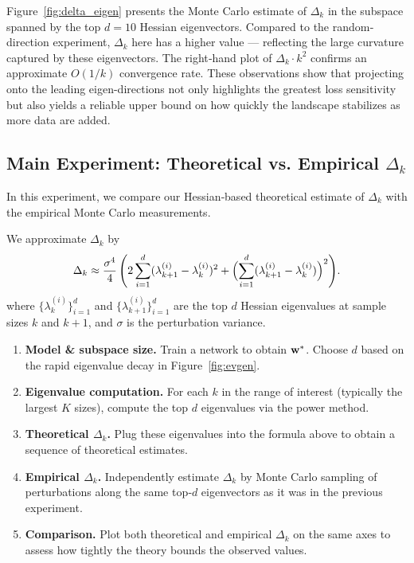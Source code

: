 \documentclass{article}
\begin{document}
Figure~\ref{fig:delta_eigen} presents the Monte Carlo estimate of $\Delta_k$ in the subspace spanned by the top $d = 10$
Hessian eigenvectors. Compared to the random‐direction experiment, $\Delta_k$ here has a higher value --- reflecting the
large curvature captured by these eigenvectors. The right‐hand plot of $\Delta_k\cdot k^2$
confirms an approximate $O(1 / k)$ convergence rate. These observations show that projecting onto the leading eigen-directions not only
highlights the greatest loss sensitivity but also yields a reliable upper bound on how quickly the landscape stabilizes as more data are
added.

\subsection{Main Experiment: Theoretical vs. Empirical \texorpdfstring{$\Delta_k$}{Delta k}}

In this experiment, we compare our Hessian‐based theoretical estimate of $\Delta_k$ with the empirical Monte Carlo measurements.

We approximate $\Delta_k$ by
$$
  \Delta_k \approx
  \frac{\sigma^4}{4}\, \Biggl( 2 \sum_{i=1}^d (\lambda_{k+1}^{(i)} - \lambda_k^{(i)})^2
  + \Bigl( \sum_{i=1}^d (\lambda_{k+1}^{(i)} - \lambda_k^{(i)}) \Bigr)^2 \Biggr).
$$
where $\{\lambda_k^{(i)}\}_{i=1}^d$ and $\{\lambda_{k+1}^{(i)}\}_{i=1}^d$ are the top $d$ Hessian eigenvalues at sample sizes $k$ and $k + 1$,
and $\sigma$ is the perturbation variance.

\begin{enumerate}
  \item \textbf{Model \& subspace size.} Train a network to obtain $\mathbf{w}^*$. Choose $d$ based on the rapid eigenvalue decay in
        Figure~\ref{fig:evgen}.
  \item \textbf{Eigenvalue computation.} For each $k$ in the range of interest (typically the largest $K$ sizes), compute the top
        $d$ eigenvalues via the power method.
  \item \textbf{Theoretical $\Delta_k$.} Plug these eigenvalues into the formula above to obtain a sequence of theoretical estimates.
  \item \textbf{Empirical $\Delta_k$.} Independently estimate $\Delta_k$ by Monte Carlo sampling of perturbations along the same
        top‐$d$ eigenvectors as it was in the previous experiment.
  \item \textbf{Comparison.} Plot both theoretical and empirical $\Delta_k$ on the same axes to assess how tightly the theory bounds
        the observed values.
\end{enumerate}
\end{document}
